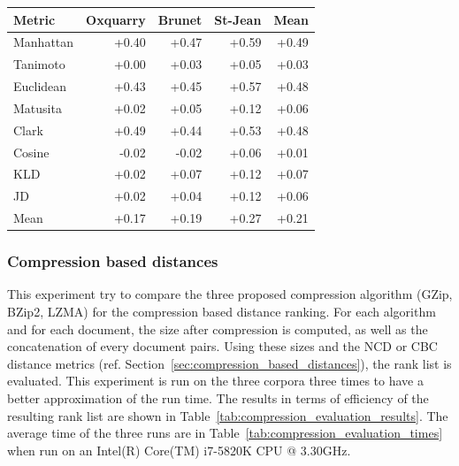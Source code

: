 \begin{table}
  \vspace{0.5cm}

  \label{tab:gain_750_mfw}
  \begin{tabular}{l r r r|r}
    \toprule
    Metric & Oxquarry & Brunet & St-Jean & Mean \\
    \midrule
    Manhattan & +0.40 & +0.47 & +0.59 & +0.49 \\
    Tanimoto  & +0.00 & +0.03 & +0.05 & +0.03 \\
    Euclidean & +0.43 & +0.45 & +0.57 & +0.48 \\
    Matusita  & +0.02 & +0.05 & +0.12 & +0.06 \\
    Clark     & +0.49 & +0.44 & +0.53 & +0.48 \\
    Cosine    & -0.02 & -0.02 & +0.06 & +0.01 \\
    KLD       & +0.02 & +0.07 & +0.12 & +0.07 \\
    JD        & +0.02 & +0.04 & +0.12 & +0.06 \\
    \midrule
    Mean      & +0.17 & +0.19 & +0.27 & +0.21 \\
    \bottomrule
  \end{tabular}
\end{table}

\subsubsection{Compression based distances}

This experiment try to compare the three proposed compression algorithm (GZip, BZip2, LZMA) for the compression based distance ranking.
For each algorithm and for each document, the size after compression is computed, as well as the concatenation of every document pairs.
Using these sizes and the NCD or CBC distance metrics (ref. Section~\ref{sec:compression_based_distances}), the rank list is evaluated.
This experiment is run on the three corpora three times to have a better approximation of the run time.
The results in terms of efficiency of the resulting rank list are shown in Table~\ref{tab:compression_evaluation_results}.
The average time of the three runs are in Table~\ref{tab:compression_evaluation_times} when run on an Intel(R) Core(TM) i7-5820K CPU @ 3.30GHz.

